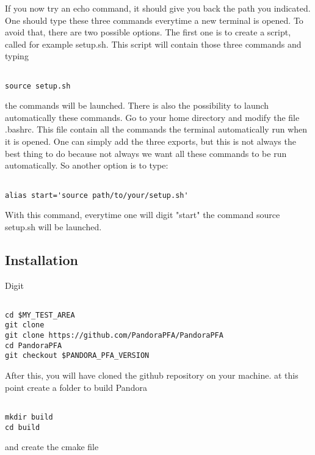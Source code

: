 If you now try an echo command, it should give you back the path you indicated. One should type these three commands everytime a new terminal is opened. To avoid that, there are two possible options. The first one is to create a script, called for example setup.sh. This script will contain those three commands and typing 

\begin{verbatim}

source setup.sh

\end{verbatim}

the commands will be launched. There is also the possibility to launch automatically these commands. Go to your home directory and modify the file .bashrc. This file contain all the commands the terminal automatically run when it is opened. One can simply add the three exports, but this is not always the best thing to do because not always we want all these commands to be run automatically. So another option is to type:

\begin{verbatim}

alias start='source path/to/your/setup.sh'

\end{verbatim}

With this command, everytime one will digit "start" the command source setup.sh will be launched.

\subsection{Installation} \label{sssec:installation} 

Digit

\begin{verbatim}

cd $MY_TEST_AREA
git clone 
git clone https://github.com/PandoraPFA/PandoraPFA
cd PandoraPFA
git checkout $PANDORA_PFA_VERSION

\end{verbatim}

After this, you will have cloned the github repository on your machine. at this point create a folder to build Pandora

\begin{verbatim}

mkdir build
cd build

\end{verbatim}

and create the cmake file

